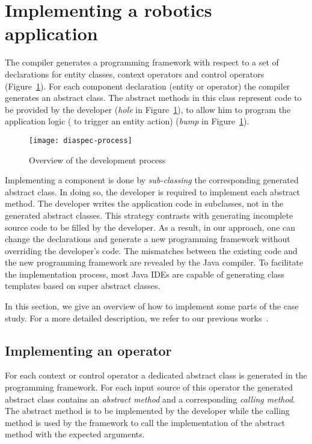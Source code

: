 
\section{Implementing a robotics application}
\label{sec:implementing}

The \diaspec{} compiler generates a programming framework with respect
to a set of declarations for entity classes, context operators and
control operators (Figure~\ref{fig:diaspec-process}). For each
component declaration (entity or operator) the compiler generates an
abstract class. The abstract methods in this class represent code to
be provided by the developer (\emph{hole} in
Figure~\ref{fig:diaspec-process}), to allow him to program the
application logic (\eg{} to trigger an entity action) (\textit{bump}
in Figure~\ref{fig:diaspec-process}).

\begin{figure}
  \centering
  \texttt{[image: diaspec-process]}
  \caption{Overview of the \diaspec{} development process}
  \label{fig:diaspec-process}
\end{figure}

Implementing a \diaspec{} component is done by \textit{sub-classing}
the corresponding generated abstract class. In doing so, the developer
is required to implement each abstract method. The developer writes
the application code in subclasses, not in the generated abstract
classes. This strategy contrasts with generating incomplete source
code to be filled by the developer. As a result, in our approach, one
can change the \diaspec{} declarations and generate a new programming
framework without overriding the developer's code. The mismatches
between the existing code and the new programming framework are
revealed by the Java compiler. To facilitate the implementation
process, most Java IDEs are capable of generating class templates
based on super abstract classes.

In this section, we give an overview of how to implement some parts of
the case study. For a more detailed description, we refer to our
previous works~\cite{Cass09b,Cass11a,Cass11b}.

\subsection{Implementing an operator}

For each context or control operator a dedicated abstract class is
generated in the programming framework. For each input source of this
operator the generated abstract class contains an \emph{abstract
  method} and a corresponding \emph{calling method}. The abstract
method is to be implemented by the developer while the calling method
is used by the framework to call the implementation of the abstract
method with the expected arguments.

